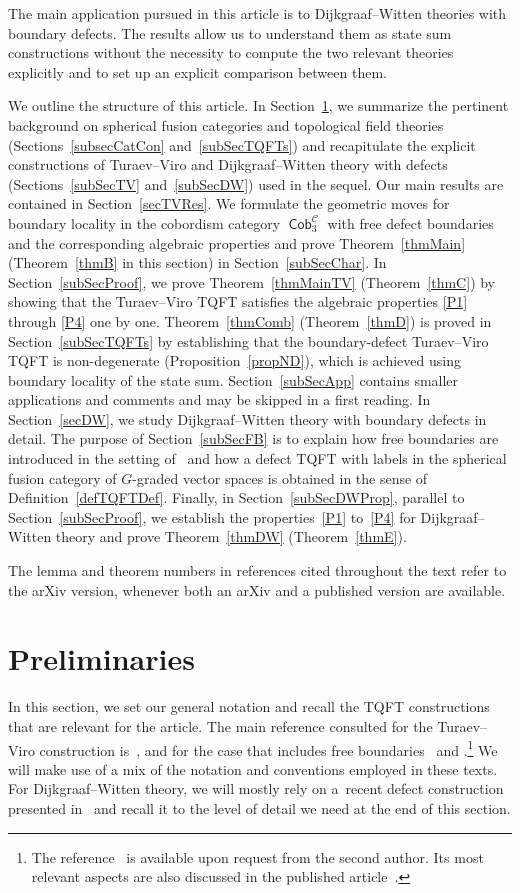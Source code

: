 \documentclass[pdftex]{sigma}
\DeclareMathOperator{\Cob}{\mathsf{Cob}}
\DeclareMathOperator{\calc}{\mathcal{C}}
\numberwithin{equation}{section}
\theoremstyle{definition}
\begin{document}
The main application pursued in this article is to Dijkgraaf--Witten theories with boundary defects. The results allow us to understand them as state sum constructions without the necessity to compute the two relevant theories explicitly and to set up an explicit comparison between them.

We outline the structure of this article. In Section~\ref{secPrel}, we summarize the pertinent background on spherical fusion categories and topological field theories (Sections~\ref{subsecCatCon} and~\ref{subSecTQFTs}) and recapitulate the explicit constructions of Turaev--Viro and Dijkgraaf--Witten theory with defects (Sections~\ref{subSecTV} and~\ref{subSecDW}) used in the sequel. Our main results are contained in Section~\ref{secTVRes}. We formulate the geometric moves for boundary locality in the cobordism category $\Cob_3^{\calc}$ with free defect boundaries and the corresponding algebraic properties and prove Theorem~\ref{thmMain} (Theorem~\ref{thmB} in this section) in Section~\ref{subSecChar}. In Section~\ref{subSecProof}, we prove Theorem~\ref{thmMainTV} (Theorem~\ref{thmC}) by showing that the Turaev--Viro TQFT satisfies the algebraic properties \ref{P1} through \ref{P4} one by one. Theorem~\ref{thmComb} (Theorem~\ref{thmD}) is proved in Section~\ref{subSecTQFTs} by establishing that the boundary-defect Turaev--Viro TQFT is non-degenerate (Proposition~\ref{propND}), which is achieved using boundary locality of the state sum. Section~\ref{subSecApp} contains smaller applications and comments and may be skipped in a first reading. In Section~\ref{secDW}, we study Dijkgraaf--Witten theory with boundary defects in detail. The purpose of Section~\ref{subSecFB} is to explain how free boundaries are introduced in the setting of~\cite{FMM} and how a defect TQFT with labels in the spherical fusion category of $G$-graded vector spaces is obtained in the sense of Definition~\ref{defTQFTDef}. Finally, in Section~\ref{subSecDWProp}, parallel to Section~\ref{subSecProof}, we establish the properties~\ref{P1} to~\ref{P4} for Dijkgraaf--Witten theory and prove Theorem~\ref{thmDW} (Theorem~\ref{thmE}).

The lemma and theorem numbers in references cited throughout the text refer to the arXiv version, whenever both an arXiv and a published version are available.

\section{Preliminaries}
\label{secPrel}
In this section, we set our general notation and recall the TQFT constructions that are relevant for the article. The main reference consulted for the Turaev--Viro construction is~\cite{TV}, and for the case that includes free boundaries~\cite{F} and \cite{FS}.\footnote{The reference~\cite{F} is available upon request from the second author. Its most relevant aspects are also discussed in the published article~\cite{FS}.} We will make use of a mix of the notation and conventions employed in these texts. For Dijkgraaf--Witten theory, we will mostly rely on a~recent defect construction presented in~\cite{FMM} and recall it to the level of detail we need at the end of this section.
\end{document}
